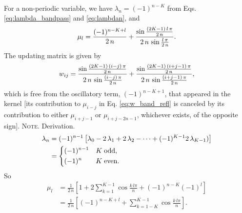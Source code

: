 \documentclass[reprint, superscriptaddress, floatfix]{revtex4-1}
\newcommand{\note}[1]{{\color{DarkGreen}\footnotesize \textsc{Note.} #1}}
\begin{document}
For a non-periodic variable,
we have $\lambda_n = (-1)^{n-K}$
from Eqs. \eqref{eq:lambda_bandpass} and \eqref{eq:lambdan},
and
\begin{equation}
  \mu_l
  =
  \frac{ (-1)^{n-K+l} } { 2 \, n }
    +
  \frac{
    \sin
    \frac{ (2 K - 1) \, l \, \pi }
         {         2 \, n        }
  }
  {
    2 \, n \, \sin \frac{ l \, \pi } { 2 \, n }
  }
  .
  \notag
\end{equation}
%
The updating matrix is given by
%
\begin{equation}
  w_{ij}
  =
    \frac{
      \sin
      \frac{ (2 K - 1) \, (i-j) \, \pi }
           {         2 \, n        }
    }
    {
      2 \, n \, \sin \frac{ (i-j) \, \pi } { 2 \, n }
    }
    +
    \frac{
      \sin
      \frac{ (2 K - 1) \, (i+j-1) \, \pi }
           {         2 \, n        }
    }
    {
      2 \, n \, \sin \frac{ (i+j-1) \, \pi } { 2 \, n }
    }
  ,
  \notag
\end{equation}
%
which is free from the oscillatory term, $(-1)^{n-K+1}$,
that appeared in the kernel
[its contribution to $\mu_{i-j}$ in Eq. \eqref{eq:w_band_refl}
is canceled by its contribution to either $\mu_{i+j-1}$
or $\mu_{i+j-2n-1}$,
whichever exists, of the opposite sign].
%
\note{Derivation.
\begin{align*}
  \lambda_{n}
  &=
  (-1)^{n-1}
  \left[
    \lambda_0
    - 2 \, \lambda_1
    + 2 \, \lambda_2 - \cdots
    + (-1)^{K-1} 2 \, \lambda_{K-1})
  \right]
  \\
  &=
  \begin{dcases}
    (-1)^{n-1} & K \mathrm{\; odd,} \\
    (-1)^n     & K \mathrm{\; even.}
  \end{dcases}
\end{align*}
So
\begin{align*}
  \mu_l
  &=
  \frac{1}{2\,n}
  \left[
    1 +
    2 \sum_{k=1}^{K-1}
    \cos \frac { k \, l \pi } { n }
    +
    (-1)^{n-K} (-1)^l
  \right]
  \\
  &=
  \frac{1}{2\,n}
  \left[
    (-1)^{n-K+l}
    +
    \sum_{k=1-K}^{K-1}
    \cos \frac { k \, l \pi } { n }
  \right]
  .
\end{align*}
}%
\end{document}
